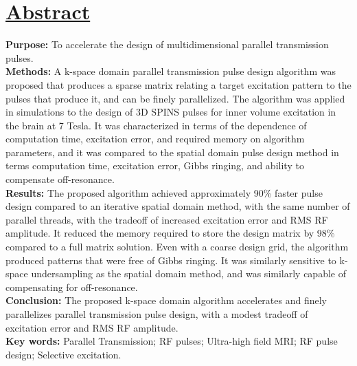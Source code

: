 \documentclass[11pt]{article}
\begin{document}
\section*{\underline{Abstract}} 
{\bf Purpose:}
To accelerate the design of multidimensional parallel transmission pulses. 
\\[1em]
{\bf Methods:}
A k-space domain parallel transmission pulse design algorithm was proposed that
produces a sparse matrix relating a target excitation pattern to the pulses that produce it,
and can be finely parallelized. 
The algorithm was applied in simulations to the design of 3D SPINS pulses for inner volume excitation in the brain at 7 Tesla.
It was characterized in terms of the dependence of computation time, excitation error, and required memory
on algorithm parameters,
and it was compared to the spatial domain pulse design method in terms computation time, excitation error,
Gibbs ringing, and ability to compensate off-resonance.
\\[1em]
{\bf Results:}
The proposed algorithm achieved approximately 90\% faster pulse design compared to 
an iterative spatial domain method, with the same number of parallel threads,
with the tradeoff of increased excitation error and RMS RF amplitude. 
It reduced the memory required to store the design matrix by 98\% compared to a full matrix solution.
Even with a coarse design grid, the algorithm produced patterns that were free of Gibbs ringing.
It was similarly sensitive to k-space undersampling as the spatial domain method,
and was similarly capable of compensating for off-resonance.
\\[1em]
{\bf Conclusion:}
The proposed k-space domain algorithm accelerates and finely parallelizes parallel transmission pulse design,
with a modest tradeoff of excitation error and RMS RF amplitude.
\\[1em]
{\bf \noindent Key words:} Parallel Transmission; RF pulses; Ultra-high field MRI; RF pulse design; Selective excitation.

\pagebreak














\pagebreak
\end{document}
